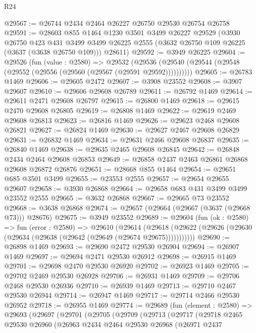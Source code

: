 \begin{lexlean}{R24}
\begin{coremodule}
@29567 := @26744 @2434 @2464 @26227 @26750 @29530 @26754 @26758
@29591 := @28603
    @855
    @1464
    @1230
    @3501
    @3499
    @26227
    @29529
    (@3930
      @26750
      @423
      @431
      @3499
      @3499
      @26225
      @2555
      (@3632 @26750 @109 @26225 (@3637 (@3638 @26750 @109)))
      @28611)
@29592 := @3949 @26225
@29604 := @29526
    (fun (value : @2580) =>
    @29532 (@29536 (@29540 (@29544 (@29548 (@29552 (@29556 (@29560 (@29567 (@29591 @29592))))))))))
@29605 := @26783 @1469
@29606 := @29605 @2472
@29607 := @3908 @23552
@29608 := @3907 @29607
@29610 := @29606 @29608 @26789
@29611 := @26792 @1469
@29614 := @29611 @2471 @29608 @26797
@29615 := @26800 @1469
@29618 := @29615 @2470 @29608 @26805
@29619 := @26808 @1469
@29622 := @29619 @2469 @29608 @26813
@29623 := @26816 @1469
@29626 := @29623 @2468 @29608 @26821
@29627 := @26824 @1469
@29630 := @29627 @2467 @29608 @26829
@29631 := @26832 @1469
@29634 := @29631 @2466 @29608 @26837
@29635 := @26840 @1469
@29638 := @29635 @2465 @29608 @26845
@29642 := @26848 @2434 @2464 @29608 @26853
@29649 := @26858 @2437 @2463 @26861 @26868 @29608 @26872 @26876
@29651 := @28668 @855 @1464
@29654 := @29651 @685 @3501 @3499
@29655 := @23553 @2555
@29657 := @29654 @29655 @29607
@29658 := @3930 @26868
@29664 := @29658 @683 @431 @3499 @3499 @23552 @2555
@29665 := @3632 @26868
@29667 := @29665 @73 @23552
@29668 := @3638 @26868
@29674 := @29657 (@29664 (@29667 (@3637 (@29668 @73))) @28676)
@29675 := @3949 @23552
@29689 := @29604
    (fun (ok : @2580) =>
    fun (error : @2580) =>
    @29610
      (@29614
        (@29618 (@29622 (@29626 (@29630 (@29634 (@29638 (@29642 (@29649 (@29674 @29675)))))))))))
@29690 := @26898 @1469
@29693 := @29690 @2472 @29530 @26904
@29694 := @26907 @1469
@29697 := @29694 @2471 @29530 @26912
@29698 := @26915 @1469
@29701 := @29698 @2470 @29530 @26920
@29702 := @26923 @1469
@29705 := @29702 @2469 @29530 @26928
@29706 := @26931 @1469
@29709 := @29706 @2468 @29530 @26936
@29710 := @26939 @1469
@29713 := @29710 @2467 @29530 @26944
@29714 := @26947 @1469
@29717 := @29714 @2466 @29530 @26952
@29718 := @26955 @1469
@29774 := @29689
    (fun (element : @2580) =>
    @29693
      (@29697
        (@29701
          (@29705
            (@29709
              (@29713
                (@29717
                  (@29718
                    @2465
                    @29530
                    @26960
                    (@26963
                      @2434
                      @2464
                      @29530
                      @26968
                      (@26971
                        @2437

\end{coremodule}
\end{lexlean}

